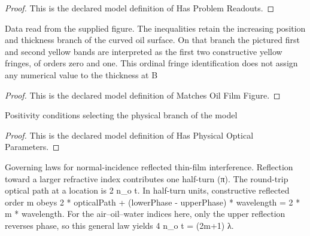 \begin{proof}
  This is the declared model definition of Has Problem Readouts.
\end{proof}
\begin{definition}
  \label{def:physics:phyx-mini-0151:phyxminiproblems-problemphyxmini0151-matchesoilfilmfigure}
  Data read from the supplied figure. The inequalities retain the increasing position and thickness branch of the curved oil surface. On that branch the pictured first and second yellow bands are interpreted as the first two constructive yellow fringes, of orders zero and one. This ordinal fringe identification does not assign any numerical value to the thickness at B
\end{definition}
\begin{proof}
  This is the declared model definition of Matches Oil Film Figure.
\end{proof}
\begin{definition}
  \label{def:physics:phyx-mini-0151:phyxminiproblems-problemphyxmini0151-hasphysicalopticalparameters}
  Positivity conditions selecting the physical branch of the model
\end{definition}
\begin{proof}
  This is the declared model definition of Has Physical Optical Parameters.
\end{proof}
\begin{definition}
  \label{def:physics:phyx-mini-0151:phyxminiproblems-problemphyxmini0151-satisfiesreflectedthinfilminterference}
  Governing laws for normal-incidence reflected thin-film interference. Reflection toward a larger refractive index contributes one half-turn (π). The round-trip optical path at a location is 2 n\_o t. In half-turn units, constructive reflected order m obeys 2 * opticalPath + (lowerPhase - upperPhase) * wavelength = 2 * m * wavelength. For the air--oil--water indices here, only the upper reflection reverses phase, so this general law yields 4 n\_o t = (2m+1) λ.
\end{definition}
